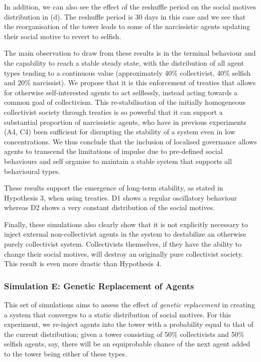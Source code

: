 In addition, we can also see the effect of the reshuffle period on the social motives distribution in  (d). The reshuffle period is 30 days in this case and we see that the reorganisation of the tower leads to some of the narcissistic agents updating their social motive to revert to selfish.

The main observation to draw from these results is in the terminal behaviour and the capability to reach a stable steady state, with the distribution of all agent types tending to a continuous value (approximately 40\% collectivist, 40\% selfish and 20\% narcissist). We propose that it is this enforcement of treaties that allows for otherwise self-interested agents to act selflessly, instead acting towards a common goal of collectivism. This re-stabilisation of the initially homogeneous collectivist society through treaties is so powerful that it can support a substantial proportion of narcissistic agents, who have in previous experiments (A4, C4) been sufficient for disrupting the stability of a system even in low concentrations. We thus conclude that the inclusion of localised governance allows agents to transcend the limitations of impulse due to pre-defined social behaviours and self organise to maintain a stable system that supports all behavioural types.

These results support the emergence of long-term stability, as stated in Hypothesis 3, when using treaties. D1 shows a regular oscillatory behaviour whereas D2 shows a very constant distribution of the social motives.

Finally, these simulations also clearly show that it is not explicitly necessary to inject external non-collectivist agents in the system to destabilize an otherwise purely collectivist system. Collectivists themselves, if they have the ability to change their social motives, will destroy an originally pure collectivist society. This result is even more drastic than Hypothesis 4.


\subsubsection{Simulation E: Genetic Replacement of Agents}

This set of simulations aims to assess the effect of \textit{genetic replacement} \cite{vacher1998genetic} \cite{froese2003steps} in creating a system that converges to a static distribution of social motives. For this experiment, we re-inject agents into the tower with a probability equal to that of the current distribution; given a tower consisting of 50\% collectivists and 50\% selfish agents, say, there will be an equiprobable chance of the next agent added to the tower being either of these types.

